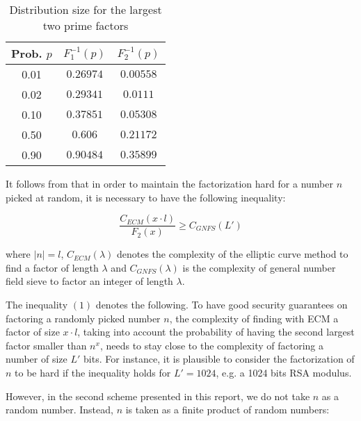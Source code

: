 \documentclass[11pt, a4paper, twoside, openright]{report}
\begin{document}
 		
 		\begin{table}
 		\begin{center}
 		
 		\begin{tabular}{ | c | c | c |}
 		
 		\hline
 		Prob. $p$  & $F_1^{-1}(p)$ & $F_2^{-1}(p)$ \\
 		\hline
 		0.01 & $0.26974$ & $0.00558$ \\
 		\hline
 		0.02 &  $0.29341$& $0.0111$ \\
 		\hline
 		0.10 & $0.37851$ & $0.05308$ \\
 		\hline 
 		0.50 & $0.606$ & $0.21172$ \\
 		\hline
 		0.90 & $0.90484$ & $0.35899$ \\
 		\hline
 		
 		\end{tabular}
 		\label{res}
 		\caption{Distribution size for the largest two prime factors}  
 		\end{center}
 		\end{table}
 		

 		
 	
	  	It follows from \cite{thesis} that in order to maintain the factorization hard for a number $n$ picked at random, it is necessary to have the following inequality: 
	
	  
	   \begin{equation} 
	   \label{eqsecn}
		 \frac{C_{ECM}(x \cdot l)}{F_2(x)} \geq C_{GNFS}(L')
	   \end{equation}
	
		\noindent where $|n|=l$, $C_{ECM}(\lambda)$ denotes the complexity of the elliptic curve method to find a factor of length $\lambda$
		and $C_{GNFS}(\lambda)$ is the complexity of general number field sieve to factor an integer of length $\lambda$.  
	
			The inequality $(1)$ denotes the following. To have good security guarantees on factoring a randomly picked number $n$, the complexity of finding with ECM a factor of size $x \cdot l$, taking into account the 
				probability of having the second largest factor smaller than $n^x$, needs to stay close to the complexity of factoring a number of size $L'$ bits. For instance, it is plausible to consider the factorization of $n$ to be hard if the inequality holds for $L' = 1024$, e.g. a 1024 	bits RSA modulus.

		However, in the second  scheme presented in this report,  we do not take $n$ as a random number. Instead, $n$ is taken as a finite product of random numbers: 
\end{document}

